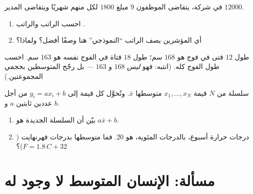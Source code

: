 \begin{exercise}[$\star\star$]\label{exo:g10:stats:7}
في شركة، يتقاضى الموظفون $9$ مبلغ $1800$ لكل منهم شهريًا ويتقاضى
المدير $12000$.
\begin{enumerate}
  \item احسب الراتب  والراتب .
  \item أي المؤشرين يصف الراتب ``النموذجي'' هنا وصفًا أفضل؟ ولماذا؟
\end{enumerate}
\end{exercise}

\begin{exercise}[$\star\star$]\label{exo:g10:stats:8}
 طول $12$ فتى في فوج هو $168$ سم؛  طول $18$ فتاة في
الفوج نفسه هو $163$ سم. احسب  طول
الفوج كله. (انتبه: فهو \emph{ليس}  $168$ و $163$
--- بل رجّح المتوسطين بحجمي المجموعتين.)
\end{exercise}

\begin{exercise}[$\star\star\star$]\label{exo:g10:stats:9}
سلسلة من $N$ قيمة $x_1, \dots, x_N$ متوسطها $\bar x$. وتُحوَّل كل قيمة
إلى $y_i = a x_i + b$ من أجل عددين ثابتين $a$ و $b$.
\begin{enumerate}
  \item بيّن أن  السلسلة الجديدة هو $a \bar x + b$.
  \item {} درجات حرارة أسبوع، بالدرجات المئوية، هو $20$.
        فما متوسطها بدرجات فهرنهايت
        ($F = 1.8\,C + 32$)؟
\end{enumerate}
\end{exercise}

\section{مسألة: الإنسان المتوسط لا وجود له}

